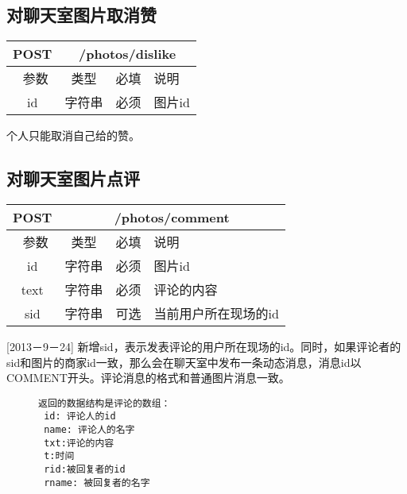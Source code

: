 \subsection{对聊天室图片取消赞}

\begin{table}[H]
   \begin{center}
\begin{tabular}{|c|c|c|p{12cm}|}
\hline
POST & \multicolumn{3}{|c|}{/photos/dislike} \\
\hline\hline
 \  参数  & 类型 & 必填 &  说明  \\
  \hline
 id  & 字符串 & 必须 & 图片id\\
\hline
\end{tabular}
   \end{center}
\end{table}
个人只能取消自己给的赞。


\subsection{对聊天室图片点评}

\begin{table}[H]
   \begin{center}
\begin{tabular}{|c|c|c|p{12cm}|}
\hline
POST & \multicolumn{3}{|c|}{/photos/comment} \\
\hline\hline
 \  参数  & 类型 & 必填 &  说明  \\
  \hline
 id  & 字符串 & 必须 & 图片id\\
   \hline
 text  & 字符串 & 必须 & 评论的内容\\
  \hline
 sid  & 字符串 & 可选 & 当前用户所在现场的id\\ 
\hline
\end{tabular}
   \end{center}
\end{table}

[2013－9－24] 新增sid，表示发表评论的用户所在现场的id。同时，如果评论者的sid和图片的商家id一致，那么会在聊天室中发布一条动态消息，消息id以COMMENT开头。评论消息的格式和普通图片消息一致。

\begin{figure}[H]
\begin{verbatim}
返回的数据结构是评论的数组：
 id: 评论人的id
 name: 评论人的名字
 txt:评论的内容
 t:时间
 rid:被回复者的id
 rname: 被回复者的名字
\end{verbatim}
\end{figure}

